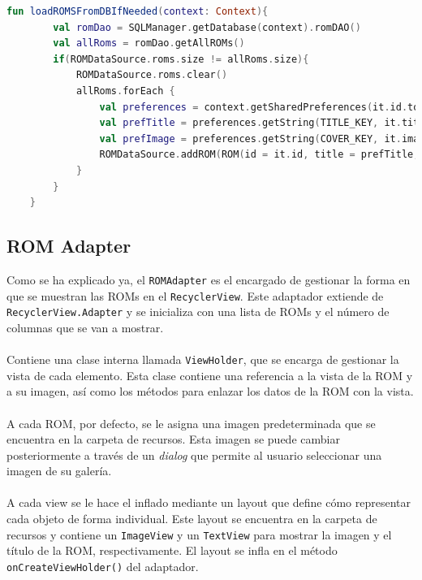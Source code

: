 \begin{lstlisting}[language=Kotlin, caption={ROM Management - Recarga de ROMs en Memoria.}, label={code:romManagementReloadRoms}]
    fun loadROMSFromDBIfNeeded(context: Context){
        val romDao = SQLManager.getDatabase(context).romDAO()
        val allRoms = romDao.getAllROMs()
        if(ROMDataSource.roms.size != allRoms.size){
            ROMDataSource.roms.clear()
            allRoms.forEach {
                val preferences = context.getSharedPreferences(it.id.toString(), Context.MODE_PRIVATE)
                val prefTitle = preferences.getString(TITLE_KEY, it.title)
                val prefImage = preferences.getString(COVER_KEY, it.imageRes)
                ROMDataSource.addROM(ROM(id = it.id, title = prefTitle, imageRes = prefImage))
            }
        }
    }
\end{lstlisting}

\subsection{ROM Adapter}
Como se ha explicado ya, el \texttt{ROMAdapter} es el encargado de gestionar la forma en que se muestran las ROMs en el \texttt{RecyclerView}. Este adaptador extiende de \texttt{RecyclerView.Adapter} y se inicializa con una lista de ROMs y el número de columnas que se van a mostrar.
\\\\
Contiene una clase interna llamada \texttt{ViewHolder}, que se encarga de gestionar la vista de cada elemento. Esta clase contiene una referencia a la vista de la ROM y a su imagen, así como los métodos para enlazar los datos de la ROM con la vista.
\\\\
A cada ROM, por defecto, se le asigna una imagen predeterminada que se encuentra en la carpeta de recursos. Esta imagen se puede cambiar posteriormente a través de un \textit{dialog} que permite al usuario seleccionar una imagen de su galería.
\\\\
A cada view se le hace el inflado mediante un layout que define cómo representar cada objeto de forma individual. Este layout se encuentra en la carpeta de recursos y contiene un \texttt{ImageView} y un \texttt{TextView} para mostrar la imagen y el título de la ROM, respectivamente. El layout se infla en el método \texttt{onCreateViewHolder()} del adaptador.

